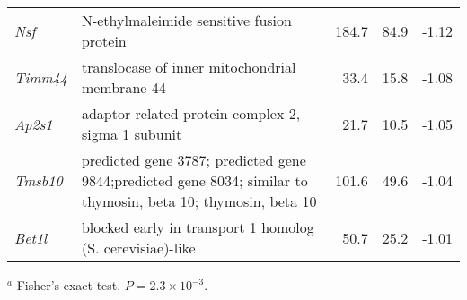 \documentclass{article}
\begin{document}
\begin{table}
\begin{small}
\begin{tabular}{l p{2.5in }rrr}
{\it Nsf }  &   N-ethylmaleimide sensitive fusion protein  &   184.7  &   84.9  &   -1.12\\
{\it Timm44 }  &   translocase of inner mitochondrial membrane 44  &   33.4  &   15.8  &   -1.08\\
{\it Ap2s1 }  &   adaptor-related protein complex 2, sigma 1 subunit  &   21.7  &   10.5  &   -1.05\\
{\it Tmsb10 }  &   predicted gene 3787; predicted gene 9844;predicted gene 8034; similar to thymosin, beta 10; thymosin, beta 10  &   101.6  &   49.6  &   -1.04\\
{\it Bet1l }  &   blocked early in transport 1 homolog (S. cerevisiae)-like  &   50.7  &   25.2  &   -1.01\\
\hline
\end{tabular}
$^a$ Fisher's exact test, $P=2.3\times 10^{-3}$.
\end{small}
\label{tab:zolocalization}
\end{table}
\end{document}
